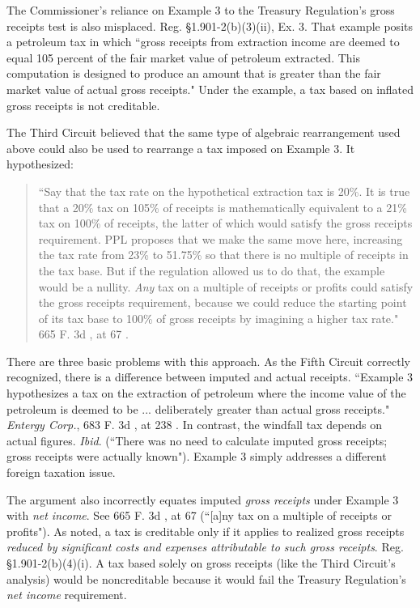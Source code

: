 \begin{select}
The Commissioner's reliance on Example 3 to the Treasury Regulation's gross receipts test is also misplaced. Reg. \S1.901-2(b)(3)(ii), Ex. 3. That example posits a petroleum tax in which ``gross receipts from extraction income are deemed to equal 105 percent of the fair market value of petroleum extracted. This computation is designed to produce an amount that is greater than the fair market value of actual gross receipts."  Under the example, a tax based on inflated gross receipts is not creditable.

The Third Circuit believed that the same type of algebraic rearrangement used above could also be used to rearrange a tax imposed on Example 3. It hypothesized: 
\begin{quote}
``Say that the tax rate on the hypothetical extraction tax is 20\%. It is true that a 20\% tax on 105\% of receipts is mathematically equivalent to a 21\% tax on 100\% of receipts, the latter of which would satisfy the gross receipts requirement. PPL proposes that we make the same move here, increasing the tax rate from 23\% to 51.75\% so that there is no multiple of receipts in the tax base. But if the regulation allowed us to do that, the example would be a nullity. \emph{Any} tax on a multiple of receipts or profits could satisfy the gross receipts requirement, because we could reduce the starting point of its tax base to 100\% of gross receipts by imagining a higher tax rate." 665 F. 3d , at 67 .
\end{quote}

There are three basic problems with this approach. As the Fifth Circuit correctly recognized, there is a difference between imputed and actual receipts. ``Example 3 hypothesizes a tax on the extraction of petroleum where the income value of the petroleum is deemed to be ... deliberately greater than actual gross receipts." \emph{Entergy Corp.}, 683 F. 3d , at 238 . In contrast, the windfall tax depends on actual figures. \emph{Ibid}. (``There was no need to calculate imputed gross receipts; gross receipts were actually known"). Example 3 simply addresses a different foreign taxation issue. 

The argument also incorrectly equates imputed \emph{gross receipts} under Example 3 with \emph{net income}. See 665 F. 3d , at 67 (``[a]ny tax on a multiple of receipts or profits"). As noted, a tax is creditable only if it applies to realized gross receipts \emph{reduced by significant costs and expenses attributable to such gross receipts}. Reg. \S1.901-2(b)(4)(i). A tax based solely on gross receipts (like the Third Circuit's analysis) would be noncreditable because it would fail the Treasury Regulation's \emph{net income} requirement.


\end{select}
